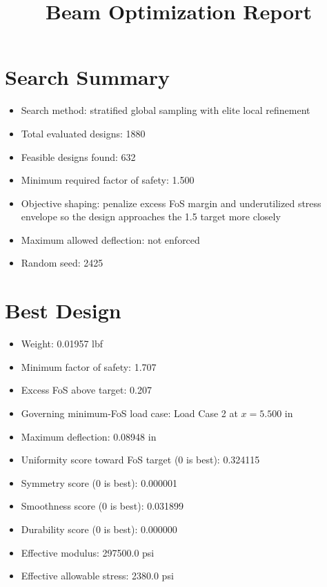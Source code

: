\documentclass[11pt]{article}
\title{Beam Optimization Report}
\date{}
\begin{document}
\maketitle

\section*{Search Summary}
\begin{itemize}
\item Search method: stratified global sampling with elite local refinement
\item Total evaluated designs: 1880
\item Feasible designs found: 632
\item Minimum required factor of safety: 1.500
\item Objective shaping: penalize excess FoS margin and underutilized stress envelope so the design approaches the 1.5 target more closely
\item Maximum allowed deflection: not enforced
\item Random seed: 2425
\end{itemize}

\section*{Best Design}
\begin{itemize}
\item Weight: 0.01957 lbf
\item Minimum factor of safety: 1.707
\item Excess FoS above target: 0.207
\item Governing minimum-FoS load case: Load Case 2 at $x=5.500$ in
\item Maximum deflection: 0.08948 in
\item Uniformity score toward FoS target (0 is best): 0.324115
\item Symmetry score (0 is best): 0.000001
\item Smoothness score (0 is best): 0.031899
\item Durability score (0 is best): 0.000000
\item Effective modulus: 297500.0 psi
\item Effective allowable stress: 2380.0 psi
\end{itemize}
\end{document}
